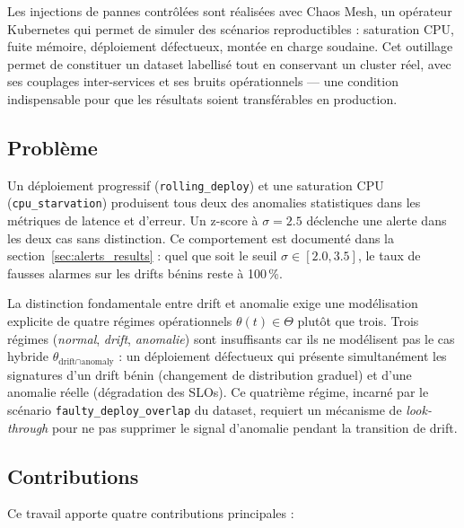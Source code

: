 Les injections de pannes contrôlées sont réalisées avec Chaos Mesh, un opérateur Kubernetes
qui permet de simuler des scénarios reproductibles : saturation CPU, fuite mémoire,
déploiement défectueux, montée en charge soudaine. Cet outillage permet de constituer un
dataset labellisé tout en conservant un cluster réel, avec ses couplages inter-services et ses
bruits opérationnels --- une condition indispensable pour que les résultats soient transférables
en production.

\subsection{Problème}

Un déploiement progressif (\texttt{rolling\_deploy}) et une saturation CPU (\texttt{cpu\_starvation})
produisent tous deux des anomalies statistiques dans les métriques de latence et d'erreur.
Un z-score à $\sigma = 2.5$ déclenche une alerte dans les deux cas sans distinction.
Ce comportement est documenté dans la section~\ref{sec:alerts_results} : quel que soit
le seuil $\sigma \in [2.0, 3.5]$, le taux de fausses alarmes sur les drifts bénins reste
à 100\,\%.

La distinction fondamentale entre drift et anomalie exige une modélisation explicite de
quatre régimes opérationnels $\theta(t) \in \Theta$ plutôt que trois.
Trois régimes (\emph{normal}, \emph{drift}, \emph{anomalie}) sont insuffisants car ils
ne modélisent pas le cas hybride $\theta_{\text{drift} \cap \text{anomaly}}$ : un
déploiement défectueux qui présente simultanément les signatures d'un drift bénin
(changement de distribution graduel) et d'une anomalie réelle (dégradation des SLOs).
Ce quatrième régime, incarné par le scénario \texttt{faulty\_deploy\_overlap} du dataset,
requiert un mécanisme de \emph{look-through} pour ne pas supprimer le signal d'anomalie
pendant la transition de drift.

\subsection{Contributions}

Ce travail apporte quatre contributions principales :

